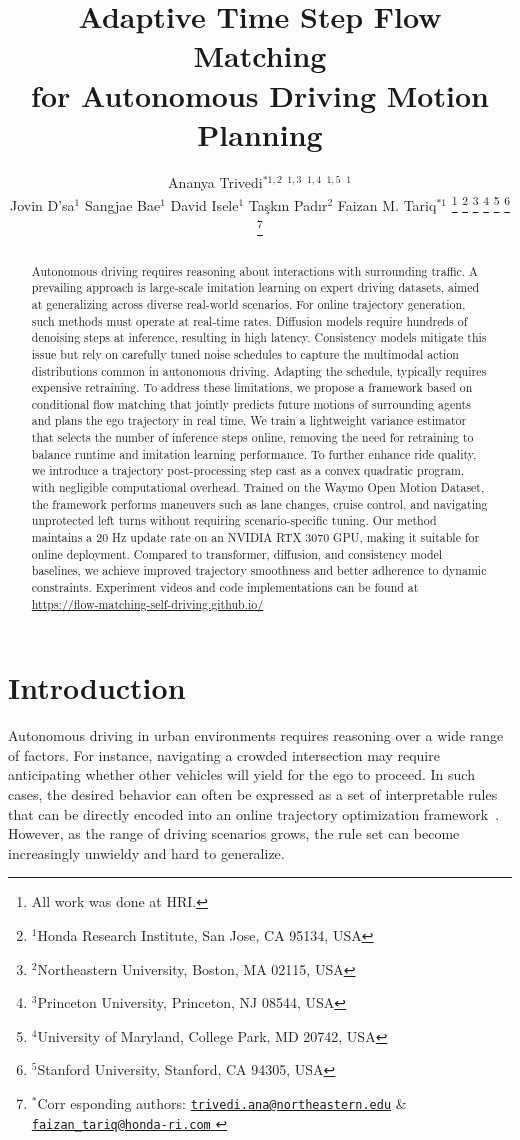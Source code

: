 \documentclass[conference]{IEEEtran}
\title{\LARGE \bf Adaptive Time Step Flow Matching \\for Autonomous Driving Motion Planning}
\author{Ananya Trivedi$^{*1,2}$ 
\quad{Anjian Li}$^{1,3}$  \quad{Mohamed Elnoor}$^{1,4}$ \quad {Yusuf Umut Ciftci}$^{1,5}$ \quad{Avinash Singh}$^1$ \\ \quad Jovin D'sa$^1$  \quad Sangjae Bae$^1$ \quad David Isele$^1$ \quad Ta\c{s}k{\i}n Pad{\i}r$^2$ \quad Faizan M. Tariq$^{*1}$ 
\thanks{All work was done at HRI.}
\thanks{$^{1}$Honda Research Institute, San Jose, CA 95134, USA}
\thanks{$^{2}$Northeastern University, Boston, MA 02115, USA}
\thanks{$^{3}$Princeton University, Princeton, NJ 08544, USA}
\thanks{$^{4}$University of Maryland, College Park, MD 20742, USA}
\thanks{$^{5}$Stanford University, Stanford, CA 94305, USA}
\thanks{$^{*}$Corr
esponding authors: \href{mailto:trivedi.ana@northeastern.edu}{\texttt{trivedi.ana@northeastern.edu}} \& \href{mailto:faizan_tariq@honda-ri.com}{\texttt{faizan\_tariq@honda-ri.com}
}}
}
\begin{document}
\maketitle

\begin{abstract}
Autonomous driving requires reasoning about interactions with surrounding traffic. A prevailing approach is large-scale imitation learning on expert driving datasets, aimed at generalizing across diverse real-world scenarios. For online trajectory generation, such methods must operate at real-time rates. Diffusion models require hundreds of denoising steps at inference, resulting in high latency. Consistency models mitigate this issue but rely on carefully tuned noise schedules to capture the multimodal action distributions common in autonomous driving. Adapting the schedule, typically requires expensive retraining. To address these limitations, we propose a framework based on conditional flow matching that jointly predicts future motions of surrounding agents and plans the ego trajectory in real time. We train a lightweight variance estimator that selects the number of inference steps online, removing the need for retraining to balance runtime and imitation learning performance. To further enhance ride quality, we introduce a trajectory post-processing step cast as a convex quadratic program, with negligible computational overhead. Trained on the Waymo Open Motion Dataset, the framework performs maneuvers such as lane changes, cruise control, and navigating unprotected left turns without requiring scenario-specific tuning. Our method maintains a 20 Hz update rate on an NVIDIA RTX 3070 GPU, making it suitable for online deployment. Compared to transformer, diffusion, and consistency model baselines, we achieve improved trajectory smoothness and better adherence to dynamic constraints. Experiment videos and code implementations can be found at \href{https://flow-matching-self-driving.github.io/}{https://flow-matching-self-driving.github.io/}
\end{abstract}

\section{Introduction}
Autonomous driving in urban environments requires reasoning over a wide range of factors. For instance, navigating a crowded intersection may require anticipating whether other vehicles will yield for the ego to proceed. In such cases, the desired behavior can often be expressed as a set of interpretable rules that can be directly encoded into an online trajectory optimization framework~\cite{rules_based_motion-planning}. However, as the range of driving scenarios grows, the rule set can become increasingly unwieldy and hard to generalize. 
\end{document}

